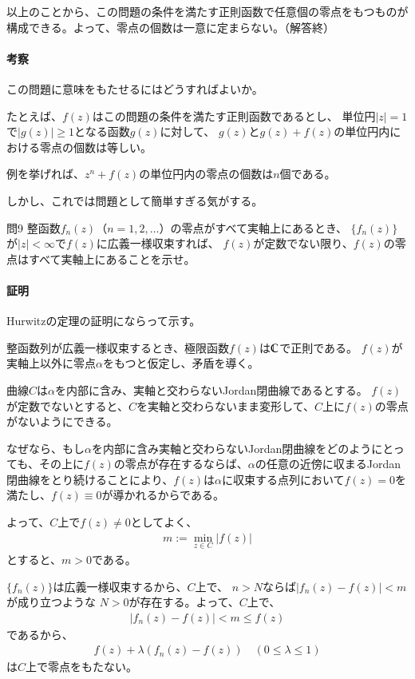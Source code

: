 以上のことから、この問題の条件を満たす正則函数で任意個の零点をもつものが構成できる。よって、零点の個数は一意に定まらない。（解答終）

\paragraph{考察}
この問題に意味をもたせるにはどうすればよいか。

たとえば、$f(z)$はこの問題の条件を満たす正則函数であるとし、
単位円$|z|=1$で$|g(z)|\ge1$となる函数$g(z)$に対して、
$g(z)$と$g(z)+f(z)$の単位円内における零点の個数は等しい。

例を挙げれば、$z^n+f(z)$の単位円内の零点の個数は$n$個である。

しかし、これでは問題として簡単すぎる気がする。

\newpage
\begin{mysimplebox}{問9}
    整函数$f_n(z)$（$n=1,2,\dots$）の零点がすべて実軸上にあるとき、
    $\{f_n(z)\}$が$|z|<\infty$で$f(z)$に広義一様収束すれば、
    $f(z)$が定数でない限り、$f(z)$の零点はすべて実軸上にあることを示せ。
\end{mysimplebox}
\paragraph{証明}
Hurwitzの定理の証明にならって示す。

整函数列が広義一様収束するとき、極限函数$f(z)$は$\mathbb{C}$で正則である。
$f(z)$が実軸上以外に零点$\alpha$をもつと仮定し、矛盾を導く。

曲線$C$は$\alpha$を内部に含み、実軸と交わらないJordan閉曲線であるとする。
$f(z)$が定数でないとすると、$C$を実軸と交わらないまま変形して、$C$上に$f(z)$の零点がないようにできる。

なぜなら、もし$\alpha$を内部に含み実軸と交わらないJordan閉曲線をどのようにとっても、その上に$f(z)$の零点が存在するならば、$\alpha$の任意の近傍に収まるJordan閉曲線をとり続けることにより、$f(z)$は$\alpha$に収束する点列において$f(z)=0$を満たし、$f(z)\equiv0$が導かれるからである。


よって、$C$上で$f(z)\neq0$としてよく、
\begin{align*}
    m:=\min_{z\in C}|f(z)|
\end{align*}
とすると、$m>0$である。

$\{f_n(z)\}$は広義一様収束するから、$C$上で、
$n>N$ならば$|f_n(z)-f(z)|<m$が成り立つような
$N>0$が存在する。よって、$C$上で、
\begin{align*}
    |f_n(z)-f(z)|<m\le f(z)
\end{align*}
であるから、
\begin{align*}
    f(z)+\lambda (f_n(z)-f(z))\quad(0\le\lambda\le1)
\end{align*}
は$C$上で零点をもたない。

